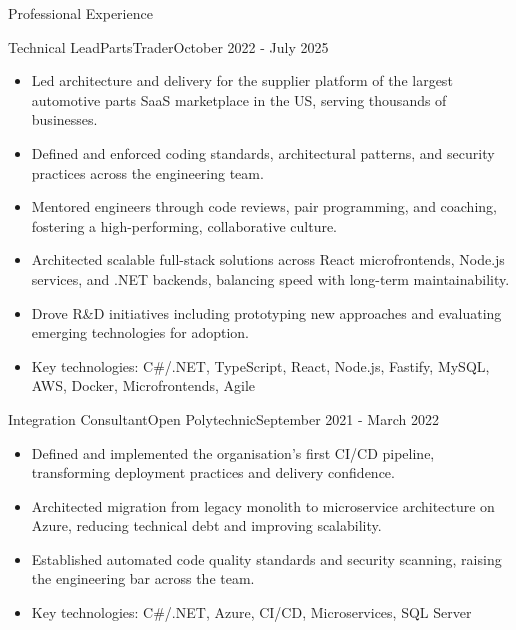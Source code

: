 \documentclass{mcdowellcv}
\begin{document}
\begin{cvsection}{Professional Experience}
    \begin{cvsubsection}{Technical Lead}{PartsTrader}{October 2022 - July 2025}
        \begin{itemize}
            \item Led architecture and delivery for the supplier platform of the largest automotive parts SaaS marketplace in the US, serving thousands of businesses.
            \item Defined and enforced coding standards, architectural patterns, and security practices across the engineering team.
            \item Mentored engineers through code reviews, pair programming, and coaching, fostering a high-performing, collaborative culture.
            \item Architected scalable full-stack solutions across React microfrontends, Node.js services, and .NET backends, balancing speed with long-term maintainability.
            \item Drove R\&D initiatives including prototyping new approaches and evaluating emerging technologies for adoption.
            \item Key technologies: C\#/.NET, TypeScript, React, Node.js, Fastify, MySQL, AWS, Docker, Microfrontends, Agile
        \end{itemize}
    \end{cvsubsection}
    
    \begin{cvsubsection}{Integration Consultant}{Open Polytechnic}{September 2021 - March 2022}
        \begin{itemize}
            \item Defined and implemented the organisation's first CI/CD pipeline, transforming deployment practices and delivery confidence.
            \item Architected migration from legacy monolith to microservice architecture on Azure, reducing technical debt and improving scalability.
            \item Established automated code quality standards and security scanning, raising the engineering bar across the team.
            \item Key technologies: C\#/.NET, Azure, CI/CD, Microservices, SQL Server
        \end{itemize}
    \end{cvsubsection}
    

\end{cvsection}
\end{document}
